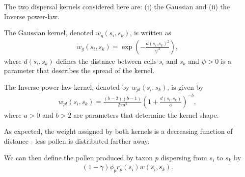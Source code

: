 \documentclass[12pt]{article}
\begin{document}
The two dispersal kernels considered here are: (i) the Gaussian and
(ii) the Inverse power-law.

The Gaussian kernel, denoted $w_g(s_i,s_k)$, is written as
\begin{align}
w_g(s_i, s_k) = \exp\left( - \frac{d(s_i, s_k)^2}{\psi^2} \right),
\end{align}
where $d(s_i,s_k)$ defines the distance between cells $s_i$ and $s_k$
and $\psi>0$ is a parameter that describes the spread of the kernel. 

The Inverse power-law kernel, denoted by $w_{pl}(s_i,s_k)$, is given by
\begin{align}
w_{pl}(s_i, s_k) = \frac{(b-2)(b-1)}{2 \pi a^2} \left( 1 + \frac{d(s_i, s_k)}{a} \right)^{-b},
\end{align}
where $a>0$ and $b>2$ are parameters that determine the kernel shape. 

As expected, the weight assigned by both kernels is a decreasing function
of distance - less pollen is distributed farther away.

 
We can then define the pollen produced by taxon $p$ dispersing from
$s_i$ to $s_k$ by
\begin{align}
(1-\gamma) \phi_p r_p(s_i) w(s_i, s_k).
\end{align}



\end{document}
